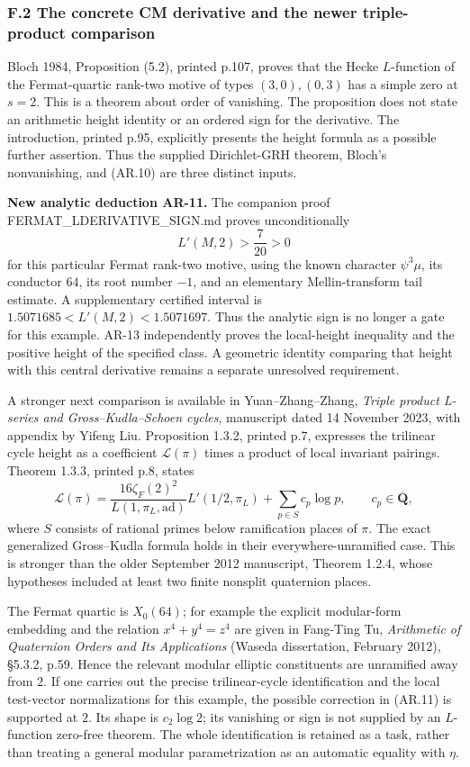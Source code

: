 \subsubsection{F.2 The concrete CM derivative and the newer
triple-product
comparison}\label{f.2-the-concrete-cm-derivative-and-the-newer-triple-product-comparison}

Bloch 1984, Proposition (5.2), printed p.107, proves that the Hecke
\(L\)-function of the Fermat-quartic rank-two motive of types
\((3,0),(0,3)\) has a simple zero at \(s=2\). This is a theorem about
order of vanishing. The proposition does not state an arithmetic height
identity or an ordered sign for the derivative. The introduction,
printed p.95, explicitly presents the height formula as a possible
further assertion. Thus the supplied Dirichlet-GRH theorem, Bloch's
nonvanishing, and (AR.10) are three distinct inputs.

\textbf{New analytic deduction AR-11.} The companion proof
FERMAT\_LDERIVATIVE\_SIGN.md proves unconditionally \[
L'(M,2)>\frac7{20}>0
\] for this particular Fermat rank-two motive, using the known character
\(\psi^3\mu\), its conductor \(64\), its root number \(-1\), and an
elementary Mellin-transform tail estimate. A supplementary certified
interval is \(1.5071685<L'(M,2)<1.5071697\). Thus the analytic sign is
no longer a gate for this example. AR-13 independently proves the
local-height inequality and the positive height of the specified class.
A geometric identity comparing that height with this central derivative
remains a separate unresolved requirement.

A stronger next comparison is available in Yuan--Zhang--Zhang,
\emph{Triple product L-series and Gross--Kudla--Schoen cycles},
manuscript dated 14 November 2023, with appendix by Yifeng Liu.
Proposition 1.3.2, printed p.7, expresses the trilinear cycle height as
a coefficient \(\mathcal L(\pi)\) times a product of local invariant
pairings. Theorem 1.3.3, printed p.8, states \[
\mathcal L(\pi)=
\frac{16\zeta_F(2)^2}{L(1,\pi_L,\mathrm{ad})}
 L'(1/2,\pi_L)+\sum_{p\in S}c_p\log p,
\qquad c_p\in\overline{\mathbf Q},
\tag{AR.11}
\] where \(S\) consists of rational primes below ramification places of
\(\pi\). The exact generalized Gross--Kudla formula holds in their
everywhere-unramified case. This is stronger than the older September
2012 manuscript, Theorem 1.2.4, whose hypotheses included at least two
finite nonsplit quaternion places.

The Fermat quartic is \(X_0(64)\); for example the explicit modular-form
embedding and the relation \(x^4+y^4=z^4\) are given in Fang-Ting Tu,
\emph{Arithmetic of Quaternion Orders and Its Applications} (Waseda
dissertation, February 2012), §5.3.2, p.59. Hence the relevant modular
elliptic constituents are unramified away from \(2\). If one carries out
the precise trilinear-cycle identification and the local test-vector
normalizations for this example, the possible correction in (AR.11) is
supported at \(2\). Its shape is \(c_2\log2\); its vanishing or sign is
not supplied by an \(L\)-function zero-free theorem. The whole
identification is retained as a task, rather than treating a general
modular parametrization as an automatic equality with \(\eta\).

